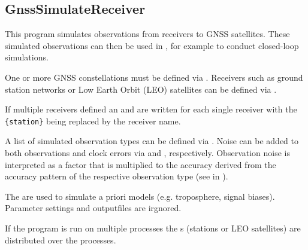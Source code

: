 \clearpage
\subsection{GnssSimulateReceiver}\label{GnssSimulateReceiver}
This program simulates observations from receivers to GNSS satellites.
These simulated observations can then be used in , for example to conduct closed-loop simulations.

One or more GNSS constellations must be defined via .
Receivers such as ground station networks or Low Earth Orbit (LEO) satellites can be defined via .

If multiple receivers defined an  and 
are written for each single receiver with the  \verb|{station}| being replaced by the receiver name.

A list of simulated observation types can be defined via . Noise can be added to both observations and clock errors
via  and , respectively. Observation noise is
interpreted as a factor that is multiplied to the accuracy derived from the accuracy pattern of the respective observation type
(see  in ).

The  are used to simulate a priori models (e.g. troposphere, signal biases).
Parameter settings and outputfiles are irgnored.

If the program is run on multiple processes the s
(stations or LEO satellites) are distributed over the processes.


